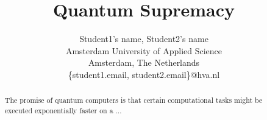 \documentclass[a4paper, 10pt]{article}
\begin{document}


%
%
%
\title{Quantum Supremacy}
\author{
Student1's name, Student2's name \\
Amsterdam University of Applied Science \\
Amsterdam, The Netherlands \\
\{student1.email, student2.email\}@hva.nl
}
%

\maketitle                %


%
%
%
\begin{abstract}
The promise of quantum computers is that certain computational tasks might be
executed exponentially faster on a ...
\end{abstract}
%




%
%
%





%


%
%
%
\printbibliography[heading=bibintoc]
%
\end{document}
